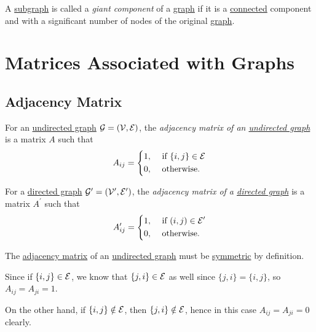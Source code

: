 \begin{definition}\label{def:giant-component}
	A \hyperref[def:subgraph]{subgraph} is called a \emph{giant component} of a \hyperref[def:graph]{graph} if it is a \hyperref[def:connected]{connected} component and with a
	significant number of nodes of the original \hyperref[def:graph]{graph}.
\end{definition}

\section{Matrices Associated with Graphs}
\subsection{Adjacency Matrix}

\begin{definition}\label{def:adjacency-matrix}
	For an \hyperref[def:undirected-graph]{undirected graph} \(\mathcal{\MakeUppercase{g}} = (\mathcal{\MakeUppercase{v}} , \mathcal{\MakeUppercase{e}} )\),
	the \emph{adjacency matrix of an \hyperref[def:undirected-graph]{undirected graph}} is a matrix \(A\) such that
	\[
		A_{ij} =\begin{dcases}
			1, & \text{ if }\{i, j\}\in\mathcal{E} \\
			0, & \text{ otherwise.}
		\end{dcases}
	\]

	For a \hyperref[def:directed-graph]{directed graph} \(\mathcal{\MakeUppercase{g}}^\prime = (\mathcal{\MakeUppercase{v}}^\prime , \mathcal{\MakeUppercase{e}}^\prime )\),
	the \emph{adjacency matrix of a \hyperref[def:directed-graph]{directed graph}} is a matrix \(A^\prime\) such that
	\[
		A^\prime _{ij} = \begin{dcases}
			1, & \text{ if }(i, j)\in\mathcal{E}^\prime \\
			0, & \text{ otherwise.}
		\end{dcases}
	\]
\end{definition}

\begin{remark}
	The \hyperref[def:adjacency-matrix]{adjacency matrix} of an \hyperref[def:undirected-graph]{undirected graph} must be \hyperref[def:symmetric-matrix]{symmetric} by definition.
\end{remark}
\begin{explanation}
	Since if \(\{i, j\}\in \mathcal{\MakeUppercase{e}} \), we know that \(\{j, i\}\in \mathcal{\MakeUppercase{e}} \) as well since \(\{j, i\} = \{i, j\}\), so
	\(A_{ij} = A_{ji} = 1\).

	On the other hand, if \(\{i, j\}\notin \mathcal{\MakeUppercase{e}} \), then \(\{j, i\}\notin \mathcal{\MakeUppercase{e}} \), hence in this case
	\(A_{ij} = A_{ji} = 0\) clearly.
\end{explanation}